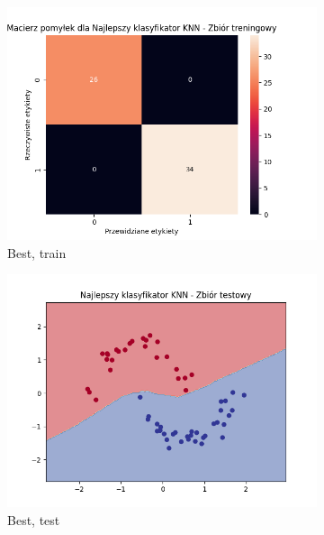 \documentclass[12pt]{article}
\newcommand*{\subfigwidth}{0.24\textwidth}
\begin{document}
\begin{figure}[H]
\begin{subfigure}[t]{\subfigwidth}
        \includegraphics[width=\linewidth]{img/exp_3/knn/2_2/best/train_matrix.png}
        \caption{Best, train}
    \end{subfigure}
    \hfill
    \begin{subfigure}[t]{\subfigwidth}
        \includegraphics[width=\linewidth]{img/exp_3/knn/2_2/best/test_boundary.png}
        \caption{Best, test}
    \end{subfigure}
    \hfill
    \begin{subfigure}[t]{\subfigwidth}

\end{subfigure}
\end{figure}
\end{document}
